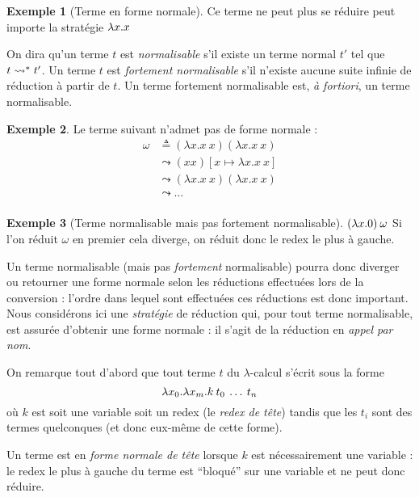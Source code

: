 \documentclass {article}
\theoremstyle{definition}
\newtheorem{example}{Exemple}
\theoremstyle{remark}
\begin{document}
\begin{example}[Terme en forme normale]
  Ce terme ne peut plus se réduire peut importe la stratégie \(\lambda x. x\) 
\end{example}

On dira qu'un terme \(t\) est \emph{normalisable} s'il existe un terme
normal \(t'\) tel que \(t \leadsto^{*} t'\). Un terme \(t\) est
\emph{fortement normalisable} s'il n'existe aucune suite infinie de
réduction à partir de \(t\). Un terme fortement normalisable est,
\textit{à fortiori}, un terme normalisable.

\begin{example}
 \label{paradoxe}
  Le terme suivant n'admet pas de forme normale :
  \begin{align*}
    \omega &\triangleq (\lambda x. x\: x) (\lambda x. x\: x) \\
           &\leadsto (x x)[x \mapsto \lambda x. x\: x] \\
           &\leadsto (\lambda x. x\: x) (\lambda x. x\: x) \\
           &\leadsto \ldots \\
  \end{align*}
\end{example}

\begin{example}[Terme normalisable mais pas fortement normalisable]
  \label{ex:divergence} 
  \((\lambda x. 0)\:\omega\)
  Si l'on réduit $\omega$ en premier cela diverge, on réduit donc le 
  redex le plus à gauche.


\end{example}

Un terme normalisable (mais pas \emph{fortement} normalisable) pourra
donc diverger ou retourner une forme normale selon les réductions
effectuées lors de la conversion : l'ordre dans lequel sont effectuées
ces réductions est donc important. Nous considérons ici une
\emph{stratégie} de réduction qui, pour tout terme normalisable, est assurée d'obtenir une forme
normale : il s'agit de la réduction en
\emph{appel par nom}.

On remarque tout d'abord que tout terme \(t\) du \(\lambda\)-calcul
s'écrit sous la forme
%
\[
\lambda x_0. \lambda x_m. k\:t_0\:\ldots\:t_n
\]
%
où \(k\) est soit une variable soit un redex (le \emph{redex de tête})
tandis que les \(t_i\) sont des termes quelconques (et donc eux-même
de cette forme).


Un terme est en \emph{forme normale de tête} lorsque \(k\) est
nécessairement une variable : le redex le plus à gauche du terme est
``bloqué'' sur une variable et ne peut donc réduire.
\end{document}
